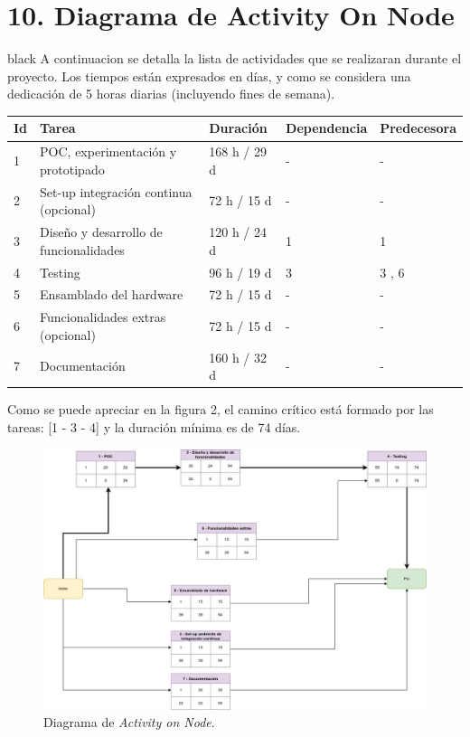 \documentclass[
11pt, %
]{charter}
\begin{document}
\section{10. Diagrama de Activity On Node}
\label{sec:AoN}

\begin{consigna}{black}
A continuacion se detalla la lista de actividades que se realizaran durante el proyecto. Los tiempos están expresados en días, y como se considera una dedicación de 5 horas diarias (incluyendo fines de semana). 

\begin{table}[ht]
\begin{tabularx}{\linewidth}{@{}|l|X|l|l|l|@{}}
\hline
\rowcolor[HTML]{C0C0C0} 
Id	& Tarea           										& Duración 				 	& Dependencia	& Predecesora 	\\ \hline

1	& POC, experimentación y prototipado					& 168 h / 29 d				& -				&  -      		\\ \hline
2	& Set-up integración continua (opcional)				& 72 h / 15 d   			& -        		&  -			\\ \hline
3	& Diseño y desarrollo de funcionalidades    			& 120 h / 24 d				& 1			 	& 1				\\ \hline
4	& Testing								    			& 96 h / 19 d				& 3				& 3 , 6			\\ \hline
5	& Ensamblado del hardware				    			& 72 h / 15 d				& -				& -				\\ \hline
6	& Funcionalidades extras (opcional)						& 72 h / 15 d				& -				& - 			\\ \hline
7	& Documentación    										& 160 h / 32 d				& -			 	& -				\\ \hline

\end{tabularx}
\end{table}


Como se puede apreciar en la figura 2, el camino crítico está formado por las tareas: [1 - 3 - 4] y la duración mínima es de 74 días.


\begin{figure}[htpb]
\centering 
\includegraphics[width=.9\textwidth]{./Figuras/ProyectoFinal-Page-8.jpg}
\caption{Diagrama de \textit{Activity on Node}.}
\label{fig:diagBloques}
\end{figure}
\end{consigna}
\end{document}

